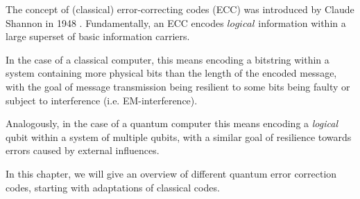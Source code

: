 The concept of (classical) error-correcting codes (ECC) was
introduced by Claude Shannon in 1948 \cite{shannon}.
Fundamentally, an ECC encodes $logical$ information within
a large superset of basic information carriers.

In the case of a classical computer, this means encoding a
bitstring within a system containing more physical bits
than the length of the encoded message, with the goal of message transmission
being resilient to some bits being faulty or subject to interference (i.e. EM-interference).

Analogously, in the case of a quantum computer this means encoding a \emph{logical}
qubit within a system of multiple qubits, with a similar goal of resilience towards
errors caused by external influences.

In this chapter, we will give an overview of different quantum error correction codes,
starting with adaptations of classical codes.

\newpage


\newpage